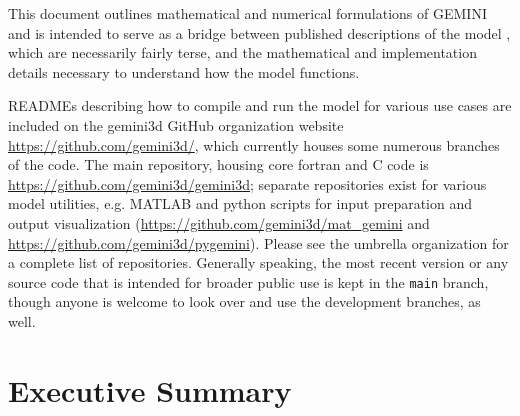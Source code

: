 \documentclass[11pt,letterpaper]{article}
\begin{document}
This document outlines mathematical and numerical formulations of GEMINI and is intended to serve as a bridge between published descriptions of the model \citep{Zettergren:2012,Zettergren:2014,Zettergren:2015,Zettergren:2015b}, which are necessarily fairly terse, and the mathematical and implementation details necessary to understand how the model functions.  

READMEs describing how to compile and run the model for various use cases are included on the gemini3d GitHub organization website \url{https://github.com/gemini3d/}, which currently houses some numerous branches of the code.  The main repository, housing core fortran and C code is \url{https://github.com/gemini3d/gemini3d}; separate repositories exist for various model utilities, e.g. MATLAB and python scripts for input preparation and output visualization (\url{https://github.com/gemini3d/mat_gemini} and \url{https://github.com/gemini3d/pygemini}).  Please see the umbrella organization for a complete list of repositories.  Generally speaking, the most recent version or any source code that is intended for broader public use is kept in the \texttt{main} branch, though anyone is welcome to look over and use the development branches, as well.  

\section{Executive Summary}
\end{document}
